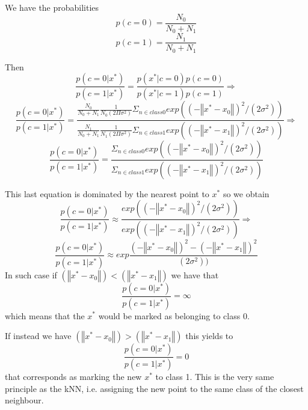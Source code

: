 We have the probabilities
\[ p(c=0) = \frac{N_0}{N_0 + N_1}  \]
\[ p(c=1) = \frac{N_1}{N_0 + N_1}  \]

Then
\[
    \frac{p(c=0 | x^*)}{p(c=1 | x^*)} =
    \frac{p(x^* | c=0) p(c=0)}
         {p(x^* | c=1) p(c=1)} \Rightarrow
\]
\[
    \frac{p(c=0 | x^*)}{p(c=1 | x^*)} =
    \frac{\frac{N_0}{N_0 + N_1} 
            \frac{1}{N_0(2\Pi\sigma^2)} \Sigma_{n\in class0} 
                exp((-\left\Vert x^* - x_0 \right\Vert)^2/(2\sigma^2)) }
        {\frac{N_1}{N_0 + N_1} 
            \frac{1}{N_1(2\Pi\sigma^2)} \Sigma_{n\in class1} 
                exp((-\left\Vert x^* - x_1 \right\Vert)^2/(2\sigma^2)) } 
       \Rightarrow
\]
\[
    \frac{p(c=0 | x^*)}{p(c=1 | x^*)} =
    \frac{\Sigma_{n\in class0} 
                exp((-\left\Vert x^* - x_0 \right\Vert)^2/(2\sigma^2)) }
        {\Sigma_{n\in class1} 
                exp((-\left\Vert x^* - x_1 \right\Vert)^2/(2\sigma^2)) } 
\]

This last equation is dominated by the nearest point to $x^*$ so we obtain
\[
    \frac{p(c=0 | x^*)}{p(c=1 | x^*)} \approx 
    \frac{exp((-\left\Vert x^* - x_0 \right\Vert)^2/(2\sigma^2))}
         {exp((-\left\Vert x^* - x_1 \right\Vert)^2/(2\sigma^2))}
    \Rightarrow
\]
\[
    \frac{p(c=0 | x^*)}{p(c=1 | x^*)} \approx 
    exp\frac{(-\left\Vert x^* - x_0 \right\Vert)^2 - 
                (-\left\Vert x^* - x_1 \right\Vert)^2} 
            {(2\sigma^2))}
\]
In such case if 
$(\left\Vert x^* - x_0 \right\Vert) < (\left\Vert x^* - x_1\right\Vert)$
we have that 
\[
    \frac{p(c=0 | x^*)}{p(c=1 | x^*)} = \infty
\]
which means that the $x^*$ would be marked as belonging to class 0.

If instead we have
$(\left\Vert x^* - x_0 \right\Vert) > (\left\Vert x^* - x_1\right\Vert)$
this yields to
\[
    \frac{p(c=0 | x^*)}{p(c=1 | x^*)} = 0
\]
that corresponds as marking the new $x^*$ to class 1.
This is the very same principle as the kNN, i.e. assigning the new point to the
same class of the closest neighbour.
